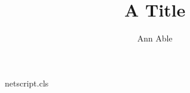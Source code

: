 \begin{filecontents*}[overwrite]{netscript.cls}
\def\@anames{}\def\@xa{}\def\@xb{}
\renewcommand\author[1]{\gdef\@anames{#1}}
\newcommand\xa[1]{\gdef\@xa{\ignorespaces#1}}
\newcommand\xb[1]{\gdef\@xb{\ignorespaces#1}}
\renewcommand\@author{\@anames\\\@xa\\\@xb}
\end{filecontents*}
\documentclass{netscript}
\usepackage[T2A]{fontenc}\usepackage[utf8]{inputenc}\usepackage{CJKutf8}

\title{A Title}
\author{Ann Able}
\maketitle
Text.

